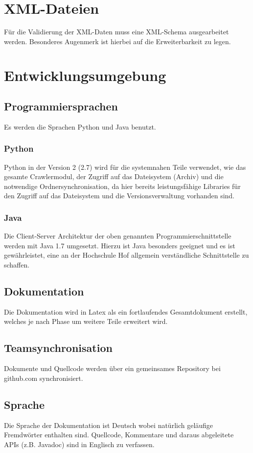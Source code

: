 \section{XML-Dateien} \label{spec:req:xml}
	Für die Validierung der XML-Daten muss eine XML-Schema ausgearbeitet werden.
	Besonderes Augenmerk ist hierbei auf die Erweiterbarkeit zu legen.

\section{Entwicklungsumgebung} \label{spec:req:devenv}
\subsection{Programmiersprachen}
	Es werden die Sprachen Python und Java benutzt.
	\subsubsection{Python}
		Python in der Version 2 (2.7) wird für die systemnahen Teile verwendet, wie das gesamte Crawlermodul, 
		der Zugriff auf das Dateisystem (Archiv) und die notwendige Ordnersynchronisation, 
		da hier bereits leistungsfähige Libraries für den Zugriff auf das Dateisystem und die Versionsverwaltung vorhanden sind.
	\subsubsection{Java}
		Die Client-Server Architektur der oben genannten Programmierschnittstelle werden mit Java 1.7 umgesetzt.
		Hierzu ist Java besonders geeignet und es ist gewährleistet, eine an der Hochschule Hof allgemein verständliche
		Schnittstelle zu schaffen.
\subsection{Dokumentation}
	Die Dokumentation wird in Latex als ein fortlaufendes Gesamtdokument erstellt, welches je nach Phase um weitere Teile erweitert wird.
\subsection{Teamsynchronisation}
	Dokumente und Quellcode werden über ein gemeinsames Repository bei github.com synchronisiert.
\subsection{Sprache}	
	Die Sprache der Dokumentation ist Deutsch wobei natürlich geläufige Fremdwörter enthalten sind. Quellcode, Kommentare und daraus abgeleitete APIs (z.B. Javadoc) sind in Englisch zu verfassen.

